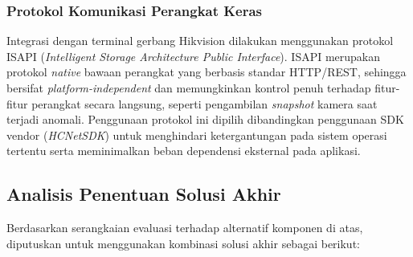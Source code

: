 \subsubsection{Protokol Komunikasi Perangkat Keras}
Integrasi dengan terminal gerbang Hikvision dilakukan menggunakan protokol ISAPI (\textit{Intelligent Storage Architecture Public Interface}). ISAPI merupakan protokol \textit{native} bawaan perangkat yang berbasis standar HTTP/REST, sehingga bersifat \textit{platform-independent} dan memungkinkan kontrol penuh terhadap fitur-fitur perangkat secara langsung, seperti pengambilan \textit{snapshot} kamera saat terjadi anomali. Penggunaan protokol ini dipilih dibandingkan penggunaan SDK vendor (\textit{HCNetSDK}) untuk menghindari ketergantungan pada sistem operasi tertentu serta meminimalkan beban dependensi eksternal pada aplikasi.

\subsection{Analisis Penentuan Solusi Akhir}
Berdasarkan serangkaian evaluasi terhadap alternatif komponen di atas, diputuskan untuk menggunakan kombinasi solusi akhir sebagai berikut:

